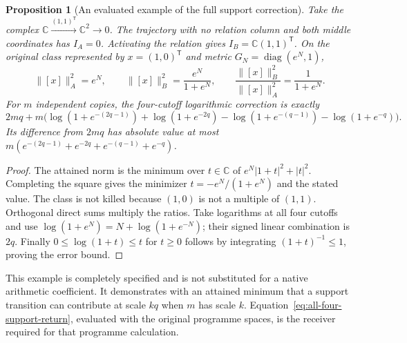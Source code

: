 \documentclass[11pt,a4paper]{article}
\newtheorem{proposition}[theorem]{Proposition}
\theoremstyle{definition}\newtheorem{definition}[theorem]{Definition}
\newcommand{\C}{\mathbb C}\newcommand{\R}{\mathbb R}
\begin{document}
\begin{proposition}[An evaluated example of the full support correction]\label{prop:evaluated-support-correction}
Take the complex $\C\xrightarrow{(1,1)^{\mathsf T}}\C^2\to0$. The trajectory with no relation column and both middle coordinates has $I_A=0$. Activating the relation gives $I_B=\C(1,1)^{\mathsf T}$. On the original class represented by $x=(1,0)^{\mathsf T}$ and metric $G_N=\operatorname{diag}(e^N,1)$,
\[
 \|[x]\|_A^2=e^N,\qquad
 \|[x]\|_B^2=\frac{e^N}{1+e^N},\qquad
 \frac{\|[x]\|_B^2}{\|[x]\|_A^2}=\frac1{1+e^N}.
\]
For $m$ independent copies, the four-cutoff logarithmic correction is exactly
\begin{equation}\label{eq:evaluated-four-cutoff-defect}
 2mq+m\bigl(\log(1+e^{-(2q-1)})+\log(1+e^{-2q})
 -\log(1+e^{-(q-1)})-\log(1+e^{-q})\bigr).
\end{equation}
Its difference from $2mq$ has absolute value at most
$m(e^{-(2q-1)}+e^{-2q}+e^{-(q-1)}+e^{-q})$.
\end{proposition}
\begin{proof}
The attained norm is the minimum over $t\in\C$ of $e^N|1+t|^2+|t|^2$. Completing the square gives the minimizer $t=-e^N/(1+e^N)$ and the stated value. The class is not killed because $(1,0)$ is not a multiple of $(1,1)$. Orthogonal direct sums multiply the ratios. Take logarithms at all four cutoffs and use $\log(1+e^N)=N+\log(1+e^{-N})$; their signed linear combination is $2q$. Finally $0\le\log(1+t)\le t$ for $t\ge0$ follows by integrating $(1+t)^{-1}\le1$, proving the error bound.
\end{proof}
This example is completely specified and is not substituted for a native arithmetic coefficient. It demonstrates with an attained minimum that a support transition can contribute at scale $kq$ when $m$ has scale $k$. Equation~\eqref{eq:all-four-support-return}, evaluated with the original programme spaces, is the receiver required for that programme calculation.
\end{document}
